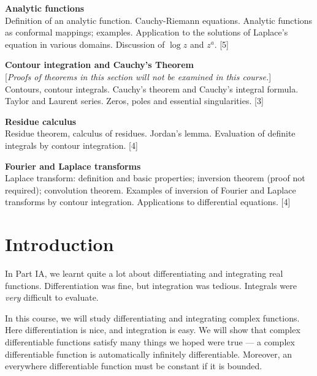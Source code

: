 \documentclass[a4paper]{article}
\begin{document}
\maketitle
{\small
\noindent\textbf{Analytic functions}\\
Definition of an analytic function. Cauchy-Riemann equations. Analytic functions as conformal mappings; examples. Application to the solutions of Laplace's equation in various domains. Discussion of $\log z$ and $z^a$.\hspace*{\fill} [5]

\vspace{10pt}
\noindent\textbf{Contour integration and Cauchy's Theorem}\\
{[}\emph{Proofs of theorems in this section will not be examined in this course.}{]}\\
Contours, contour integrals. Cauchy's theorem and Cauchy's integral formula. Taylor and Laurent series. Zeros, poles and essential singularities.\hspace*{\fill} [3]

\vspace{10pt}
\noindent\textbf{Residue calculus}\\
Residue theorem, calculus of residues. Jordan's lemma. Evaluation of definite integrals by contour integration.\hspace*{\fill} [4]

\vspace{10pt}
\noindent\textbf{Fourier and Laplace transforms}\\
Laplace transform: definition and basic properties; inversion theorem (proof not required); convolution theorem. Examples of inversion of Fourier and Laplace transforms by contour integration. Applications to differential equations.\hspace*{\fill} [4]}

\tableofcontents

\setcounter{section}{-1}
\section{Introduction}
In Part IA, we learnt quite a lot about differentiating and integrating real functions. Differentiation was fine, but integration was tedious. Integrals were \emph{very} difficult to evaluate.

In this course, we will study differentiating and integrating complex functions. Here differentiation is nice, and integration is easy. We will show that complex differentiable functions satisfy many things we hoped were true --- a complex differentiable function is automatically infinitely differentiable. Moreover, an everywhere differentiable function must be constant if it is bounded.
\end{document}
